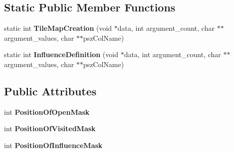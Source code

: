 \subsection*{Static Public Member Functions}
\begin{DoxyCompactItemize}
\item 
static int {\bfseries Tile\+Map\+Creation} (void $\ast$data, int argument\+\_\+count, char $\ast$$\ast$argument\+\_\+values, char $\ast$$\ast$psz\+Col\+Name)\hypertarget{classae_tiled_map_aad3cfb01a53a5665f3d896ff336efcb8}{}\label{classae_tiled_map_aad3cfb01a53a5665f3d896ff336efcb8}

\item 
static int {\bfseries Influence\+Definition} (void $\ast$data, int argument\+\_\+count, char $\ast$$\ast$argument\+\_\+values, char $\ast$$\ast$psz\+Col\+Name)\hypertarget{classae_tiled_map_af68963b8610289c1182c572d2c544737}{}\label{classae_tiled_map_af68963b8610289c1182c572d2c544737}

\end{DoxyCompactItemize}
\subsection*{Public Attributes}
\begin{DoxyCompactItemize}
\item 
int {\bfseries Position\+Of\+Open\+Mask}\hypertarget{classae_tiled_map_a8dbef291dc8e226f273e07883d590c6a}{}\label{classae_tiled_map_a8dbef291dc8e226f273e07883d590c6a}

\item 
int {\bfseries Position\+Of\+Visited\+Mask}\hypertarget{classae_tiled_map_a793cdb801de57b17a9cdc24ccf976b0a}{}\label{classae_tiled_map_a793cdb801de57b17a9cdc24ccf976b0a}

\item 
int {\bfseries Position\+Of\+Influence\+Mask}\hypertarget{classae_tiled_map_ae586f5557fe67623df0f8994035d6dfd}{}\label{classae_tiled_map_ae586f5557fe67623df0f8994035d6dfd}

\end{DoxyCompactItemize}
